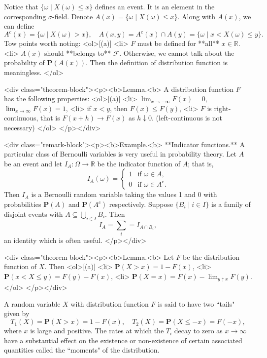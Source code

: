 Notice that $\{ \omega \;\vert\; X(\omega) \leq x\}$ defines an event. It is an element in the corresponding $\sigma$-field. Denote $A(x) = \{ \omega \;\vert\; X(\omega) \leq x \}$. Along with $A(x)$, we can define
$$\begin{equation}
    A^c(x) = \{ \omega \;\vert\; X(\omega) > x \}, \quad A(x, y) = A^c(x) \cap A(y) = \{ \omega \;\vert\; x < X(\omega) \leq y \}.
\end{equation}$$
Tow points worth noting:
<ol>[(a)]
    <li> $F$ must be defined for **all** $x \in \mathbb{R}$.
    <li> $A(x)$ should **belongs to** $\mathcal{F}$. Otherwise, we cannot talk about the probability of $\mathbf{P}(A(x))$. Then the definition of distribution function is meaningless.
</ol>

<div class="theorem-block"><p><b>Lemma.<b> 
A distribution function $F$ has the following properties:
<ol>[(a)]
    <li> $\lim_{x \to -\infty}F(x) = 0$, $\lim_{x\to\infty} F(x) = 1$,
    <li> if $x < y$, then $F(x) \leq F(y)$,
    <li> $F$ is right-continuous, that is $F(x+h) \to F(x)$ as $h \downarrow 0$. (left-continuous is not necessary)
</ol>
</p></div>

<div class="remark-block"><p><b>Example.<b> 
**Indicator functions.** A particular class of Bernoulli variables is very useful in probability theory. Let $A$ be an event and let $I_A : \Omega \to \mathbb{R}$ be the indicator function of $A$; that is,
$$\begin{equation}
    I_A(\omega) = \begin{cases} 1 & \text{if $\omega \in A$}, \\ 0 & \text{if $\omega \in A^c$}. \end{cases}
\end{equation}$$
Then $I_A$ is a Bernoulli random variable taking the values 1 and 0 with probabilities $\mathbf{P}(A)$ and $\mathbf{P}(A^c)$ respectively. Suppose $\{B_i \;\vert\; i \in I\}$ is a family of disjoint events with $A \subseteq \bigcup_{i\in I} B_i$. Then 
$$\begin{equation}
    I_A = \sum_{i} = I_{A\cap B_i},
\end{equation}$$
an identity which is often useful.
</p></div>

<div class="theorem-block"><p><b>Lemma.<b> 
Let $F$ be the distribution function of $X$. Then
<ol>[(a)]
    <li> $\mathbf{P}(X>x) = 1-F(x)$, 
    <li> $\mathbf{P}(x < X \leq y) = F(y) - F(x)$,
    <li> $\mathbf{P}(X = x) = F(x) - \lim_{y \uparrow x} F(y)$.
</ol>
</p></div>

A random variable $X$ with distribution function $F$ is said to have two ``tails" given by 
$$\begin{equation}
    T_1 (X) = \mathbf{P}(X > x) = 1 - F(x), \quad T_2(X) = \mathbf{P}(X \leq -x) = F(-x),    
\end{equation}$$
where $x$ is large and positive. The rates at which the $T_i$ decay to zero as $x\to\infty$ have a substantial effect on the existence or non-existence of certain associated quantities called the ``moments" of the distribution. 


